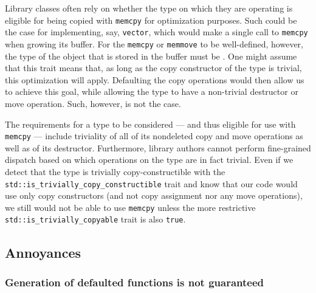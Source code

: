Library classes often rely on whether the type on which they are operating is eligible for being copied with \lstinline!memcpy! for optimization purposes.  Such could be the case for implementing, \pagebreak%
say, \lstinline!vector!, which would make a single call to \lstinline!memcpy! when growing its buffer.  
For the \lstinline!memcpy! or \lstinline!memmove! to be well-defined, however, the type of the object that is stored in the buffer must be .  One might assume that this trait means that, as long as the copy constructor of the type is trivial, this optimization will apply.  Defaulting the copy operations would then allow us to achieve this goal, while allowing the type to have a non-trivial destructor or move operation.  Such, however, is not the case.

The requirements for a type to be considered  --- and thus eligible for use with \lstinline!memcpy! --- include triviality of all of its nondeleted copy and move operations as well as of its destructor.  Furthermore, library authors cannot perform fine-grained dispatch based on which operations on the type are in fact trivial.  Even if we detect that the type is trivially copy-constructible with the \lstinline!std::is_trivially_copy_constructible! trait and know that our code would use only copy constructors (and not copy assignment nor any move operations), we still would not be able to use \lstinline!memcpy! unless the more restrictive \lstinline!std::is_trivially_copyable! trait is also \lstinline!true!.

\subsection{Annoyances}

\subsubsection[Generation of defaulted functions is not guaranteed]{Generation of defaulted functions is not guaranteed}\label{generation-of-defaulted-functions-is-not-guaranteed}

